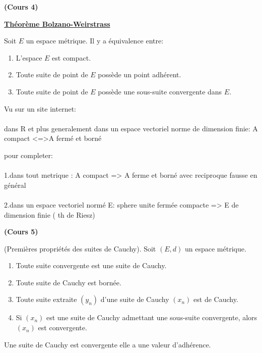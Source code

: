 \documentclass[12pt,a4paper]{article}
\begin{document}
\begin{flushleft}
\textbf{(Cours 4)}

\underline{\textbf{Théorème Bolzano-Weirstrass}}
\begin{thm}
Soit $E$ un espace métrique. Il y a équivalence entre:
\begin{enumerate}
\item L'espace $E$ est compact.
\item Toute suite de point de $E$ possède un point adhérent.
\item Toute suite de point de $E$ possède une sous-suite convergente dans $E$.
\end{enumerate}
\end{thm}

\begin{rem}
Vu sur un site internet:\\~\\
dans R et plus generalement dans un espace vectoriel norme de dimension finie: 
A compact <=>A fermé et borné 

pour completer: \\~\\

1.dans tout metrique : A compact => A ferme et borné 
avec reciproque fausse en général \\~\\

2.dans un espace vectoriel normé E: 
sphere unite fermée compacte => E de dimension finie ( th de Riesz) 
\end{rem}
\textbf{(Cours 5)}

\begin{prop}
(Premières propriétés des suites de Cauchy). Soit $(E,d)$ un espace métrique.
\begin{enumerate}
\item Toute suite convergente est une suite de Cauchy.
\item Toute suite de Cauchy est bornée.
\item Toute suite extraite $(y_n)$ d'une suite de Cauchy $(x_n)$ est de Cauchy.
\item Si $(x_n)$ est une suite de Cauchy admettant une sous-suite convergente, alors $(x_n)$ est convergente.
\end{enumerate}
\end{prop}

\begin{cor}
Une suite de Cauchy est convergente \ssi elle a une valeur d'adhérence.
\end{cor}




\end{flushleft}
\end{document}
